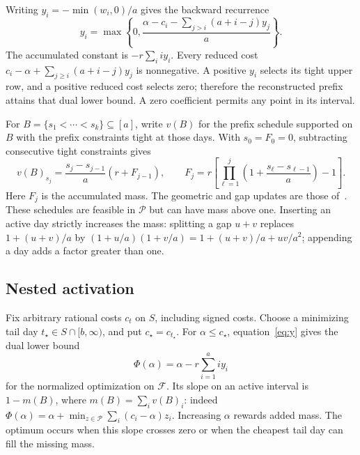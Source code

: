 \documentclass[manuscript,11pt,screen,nonacm]{acmart}
\newcommand{\Q}{\mathcal F}
\newcommand{\Pp}{\mathcal P}
\begin{document}
Writing $y_i=-\min(w_i,0)/a$ gives the backward recurrence
\begin{equation}\label{eq:y}
 y_i=\max\left\{0,\frac{\alpha-c_i-\sum_{j>i}(a+i-j)y_j}{a}\right\}.
\end{equation}
The accumulated constant is $-r\sum_iiy_i$. Every reduced cost
$c_i-\alpha+\sum_{j\ge i}(a+i-j)y_j$ is nonnegative. A positive $y_i$
selects its tight upper row, and a positive reduced cost selects zero;
therefore the reconstructed prefix attains that dual lower bound.
A zero coefficient permits any point in its interval.

For $B=\{s_1<\cdots<s_k\}\subseteq[a]$, write $v(B)$ for the prefix
schedule supported on $B$ with the prefix constraints tight at those days.
With $s_0=F_0=0$, subtracting consecutive tight constraints gives
\begin{equation}\label{eq:gap}
 v(B)_{s_j}=\frac{s_j-s_{j-1}}a(r+F_{j-1}),\qquad
 F_j=r\left[\prod_{\ell=1}^j
       \left(1+\frac{s_\ell-s_{\ell-1}}a\right)-1\right].
\end{equation}
Here $F_j$ is the accumulated mass. The geometric and gap updates
are those of~\cite[Appendix D.3--D.4]{pmlr-v306-kim26l}.
These schedules are feasible in $\Pp$ but can have mass above one.
Inserting an active day strictly increases the mass: splitting a gap
$u+v$ replaces $1+(u+v)/a$ by
$(1+u/a)(1+v/a)=1+(u+v)/a+uv/a^2$; appending a day adds a factor greater
than one.

\subsection{Nested activation}
Fix arbitrary rational costs $c_t$ on $S$, including signed costs.
Choose a minimizing tail day $t_\star\in S\cap[b,\infty)$, and put
$c_\star=c_{t_\star}$. For $\alpha\le c_\star$,
equation~\eqref{eq:y} gives the dual lower bound
\begin{equation}\label{eq:oracledual}
 \Phi(\alpha)=\alpha-r\sum_{i=1}^a iy_i
\end{equation}
for the normalized optimization on $\Q$. Its slope on an active interval
is $1-m(B)$, where $m(B)=\sum_i v(B)_i$: indeed
$\Phi(\alpha)=\alpha+\min_{z\in\Pp}\sum_i(c_i-\alpha)z_i$.
Increasing $\alpha$ rewards added mass. The optimum occurs when this
slope crosses zero or when the cheapest tail day can fill the missing mass.
\end{document}
